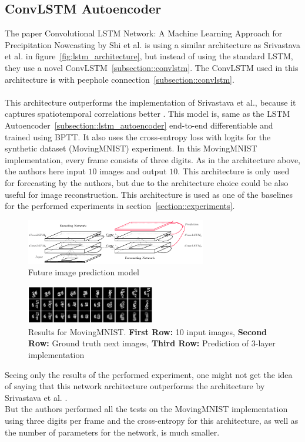 \subsection{ConvLSTM Autoencoder} \label{subsection::convlstm_autoencoder}
  The paper \glqq Convolutional LSTM Network: A Machine Learning Approach for Precipitation Nowcasting\grqq{} by Shi et al. \citep{Shi2015} is using a similar 
  architecture as Srivastava et al. in
  figure~\ref{fig:lstm_architecture}, but instead of using the standard LSTM, they use a novel ConvLSTM~\ref{subsection::convlstm}. The ConvLSTM used in this 
  architecture is with peephole connection~\ref{subsection::convlstm}.
  \\\\
  This architecture outperforms the implementation of Srivastava et al., because it \glqq captures spatiotemporal correlations better\grqq{} \cite{Shi2015}.
  This model is, same as the LSTM Autoencoder~\ref{subsection::lstm_autoencoder} end-to-end differentiable and trained using BPTT. It also uses the cross-entropy 
  loss with logits for the synthetic dataset 
  (MovingMNIST) experiment. In this MovingMNIST implementation, every frame consists of three digits. As in the architecture above, the authors here input $10$ 
  images and output $10$. This architecture is only used for forecasting by the authors, but due to the architecture choice could be also useful for image
  reconstruction. This architecture is used as one of the baselines for the performed experiments in section~\ref{section::experiments}.
  \begin{figure}[H]
   \includegraphics[width=0.7\textwidth]{../Images/shi.png}
   \centering
   \caption{Future image prediction model \cite{Shi2015}}
   \label{fig:convlstm_architecture}
  \end{figure}
  \begin{figure}[H]
   \includegraphics[width=0.5\textwidth]{../Images/shi_results_mnist.png}
   \centering
   \caption{Results for MovingMNIST. \textbf{First Row:} 10 input images, \textbf{Second Row:} Ground truth next images, \textbf{Third Row:} Prediction of 3-layer implementation \cite{Shi2015}}
   \label{fig:convlstm_results}
  \end{figure}\noindent
  Seeing only the results of the performed experiment, one might not get the idea of saying that this network architecture outperforms the architecture by
  Srivastava et al. \cite{Srivastava2015}.\\
  But the authors performed all the tests on the MovingMNIST implementation using three digits per frame and the
  cross-entropy for this architecture, as well as the number of parameters for the network, is much smaller.
 
